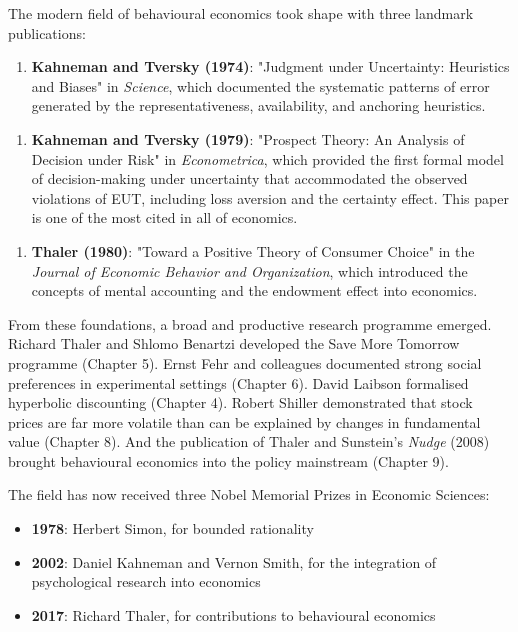 \documentclass[12pt, letterpaper]{article}
\begin{document}
The modern field of behavioural economics took shape with three landmark publications:

\begin{enumerate}
\item \textbf{Kahneman and Tversky (1974)}: "Judgment under Uncertainty: Heuristics and Biases" in \textit{Science}, which documented the systematic patterns of error generated by the representativeness, availability, and anchoring heuristics.
\end{enumerate}

\begin{enumerate}
\item \textbf{Kahneman and Tversky (1979)}: "Prospect Theory: An Analysis of Decision under Risk" in \textit{Econometrica}, which provided the first formal model of decision-making under uncertainty that accommodated the observed violations of EUT, including loss aversion and the certainty effect. This paper is one of the most cited in all of economics.
\end{enumerate}

\begin{enumerate}
\item \textbf{Thaler (1980)}: "Toward a Positive Theory of Consumer Choice" in the \textit{Journal of Economic Behavior and Organization}, which introduced the concepts of mental accounting and the endowment effect into economics.
\end{enumerate}

From these foundations, a broad and productive research programme emerged. Richard Thaler and Shlomo Benartzi developed the Save More Tomorrow programme (Chapter 5). Ernst Fehr and colleagues documented strong social preferences in experimental settings (Chapter 6). David Laibson formalised hyperbolic discounting (Chapter 4). Robert Shiller demonstrated that stock prices are far more volatile than can be explained by changes in fundamental value (Chapter 8). And the publication of Thaler and Sunstein's \textit{Nudge} (2008) brought behavioural economics into the policy mainstream (Chapter 9).

The field has now received three Nobel Memorial Prizes in Economic Sciences:
\begin{itemize}
\item \textbf{1978}: Herbert Simon, for bounded rationality
\item \textbf{2002}: Daniel Kahneman and Vernon Smith, for the integration of psychological research into economics
\item \textbf{2017}: Richard Thaler, for contributions to behavioural economics
\end{itemize}
\end{document}
